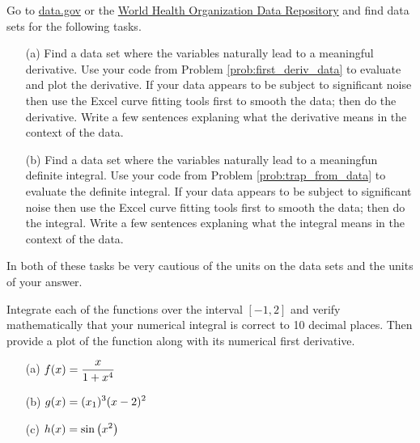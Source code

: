 \begin{problem}
    Go to \href{https://www.data.gov/}{data.gov} or the
    \href{http://apps.who.int/gho/data/?theme=home}{World Health Organization Data
    Repository} and find data sets for the following tasks.
    \begin{enumerate}
        \item[(a)] Find a data set where the variables naturally lead to a meaningful
            derivative.  Use your code from Problem  \ref{prob:first_deriv_data} to
            evaluate and plot the derivative.  If your data appears to be subject to
            significant noise then use the Excel curve fitting tools first to smooth the
            data; then do the derivative.  Write a few sentences explaning what the
            derivative means in the context of the data.
        \item[(b)] Find a data set where the variables naturally lead to a meaningfun
            definite integral.  Use your code from Problem \ref{prob:trap_from_data} to
            evaluate the definite integral.  If your data appears to be subject to
            significant noise then use the Excel curve fitting tools first to smooth the
            data; then do the integral.  Write a few sentences explaning what the
            integral means in the context of the data.
    \end{enumerate}
    In both of these tasks be very cautious of the units on the data sets and the units of
    your answer. 
\end{problem}





\begin{problem}
    Integrate each of the functions over the interval $[-1,2]$ and verify mathematically
    that your numerical integral is correct to 10 decimal places.  Then provide a plot of
    the function along with its numerical first derivative.
    \begin{enumerate}
        \item[(a)] $\displaystyle f(x) = \frac{x}{1+x^4}$
        \item[(b)] $\displaystyle g(x) = (x_1)^3 (x-2)^2$
        \item[(c)] $\displaystyle h(x) = \sin\left(x^2\right)$
    \end{enumerate}
\end{problem}


